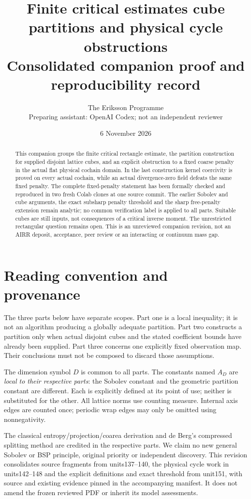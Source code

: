 \documentclass[11pt,a4paper]{article}
\title{Finite critical estimates cube partitions and physical cycle obstructions\\\large Consolidated companion proof and reproducibility record}
\author{The Eriksson Programme\\\small Preparing assistant: OpenAI Codex; not an independent reviewer}
\date{6 November 2026}
\begin{document}
\maketitle
\begin{abstract}
This companion groups the finite critical rectangle estimate, the partition
construction for supplied disjoint lattice cubes, and an explicit obstruction
to a fixed coarse penalty in the actual flat physical cochain domain. In the
last construction kernel coercivity is proved on every actual cochain,
while an actual divergence-zero field defeats the same fixed penalty.
The complete fixed-penalty statement has been formally checked and reproduced
in two fresh Colab clones at one source commit. The earlier Sobolev and cube
arguments, the exact subsharp penalty threshold and the sharp free-penalty extension remain analytic; no common
verification label is applied to all parts. Suitable cubes are still inputs,
not consequences of a critical inverse moment. The unrestricted rectangular
question remains open. This is an unreviewed companion revision, not an AIRR
deposit, acceptance, peer review or an interacting or continuum mass gap.
\end{abstract}
\section*{Reading convention and provenance}
The three parts below have separate scopes. Part one is a local inequality;
it is not an algorithm producing a globally adequate partition. Part two
constructs a partition only when actual disjoint cubes and the stated
coefficient bounds have already been supplied. Part three concerns one explicitly fixed observation map. Their conclusions must not
be composed to discard those assumptions.

The dimension symbol $D$ is common to all parts. The constants named
$A_D$ are \emph{local to their respective parts}: the Sobolev constant
and the geometric partition constant are different. Each is explicitly
defined at its point of use; neither is substituted for the other.
All lattice norms use counting measure. Internal axis edges are counted
once; periodic wrap edges may only be omitted using nonnegativity.

The classical entropy/projection/coarea derivation and de Berg's compressed
splitting method are credited in the respective parts. We claim no new
general Sobolev or BSP principle, original priority or independent discovery.
This revision consolidates source fragments from units137--140, the physical cycle work in units142--148 and the explicit definitions and exact threshold from unit151, with
source and existing evidence pinned in the accompanying manifest. It does
not amend the frozen reviewed PDF or inherit its model assessments.
\clearpage
\tableofcontents
\clearpage

\clearpage

\clearpage

\end{document}

